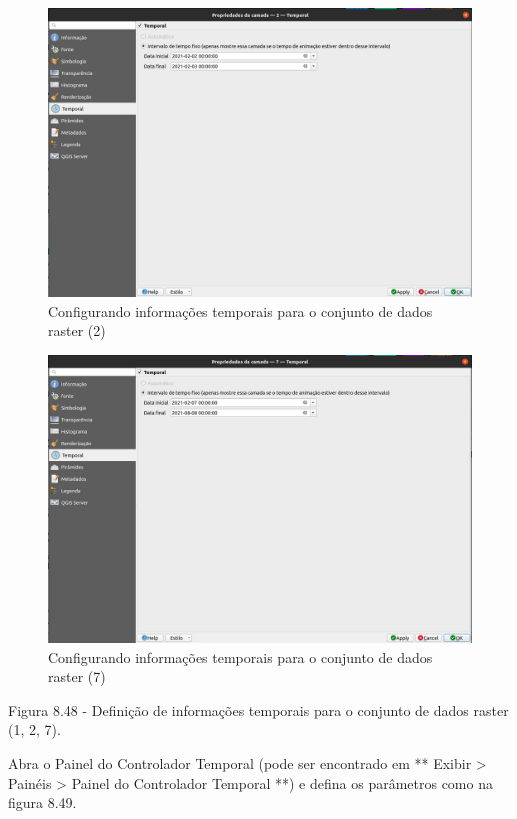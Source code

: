 \documentclass[
]{krantz}
\begin{document}
\begin{figure}
\centering
\includegraphics{media/modulo8/fig848_b.png}
\caption{Configurando informações temporais para o conjunto de dados raster (2)}
\end{figure}

\begin{figure}
\centering
\includegraphics{media/modulo8/fig848_c.png}
\caption{Configurando informações temporais para o conjunto de dados raster (7)}
\end{figure}

Figura 8.48 - Definição de informações temporais para o conjunto de dados raster (1, 2, 7).

Abra o Painel do Controlador Temporal (pode ser encontrado em ** Exibir \textgreater{} Painéis \textgreater{} Painel do Controlador Temporal **) e defina os parâmetros como na figura 8.49.
\end{document}
